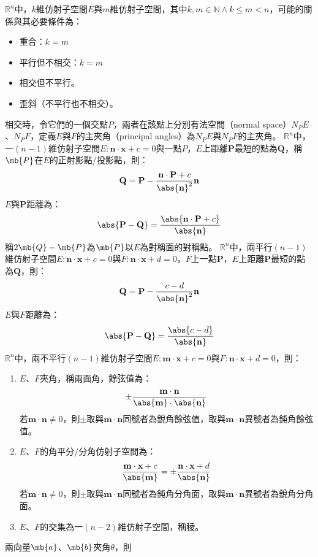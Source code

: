\documentclass[a4paper,12pt]{report}
\begin{document}
$\mathbb{R}^n$中，$k$維仿射子空間$E$與$m$維仿射子空間，其中$k,m\in\mathbb{N}\land k\leq m<n$，可能的關係與其必要條件為：
\begin{itemize}
\item 重合：$k=m$
\item 平行但不相交：$k=m$
\item 相交但不平行。
\item 歪斜（不平行也不相交）。
\end{itemize}
相交時，令它們的一個交點$P$，兩者在該點上分別有法空間（normal space）$N_PE$、$N_PF$，定義$E$與$F$的主夾角（principal angles）為$N_PE$與$N_PF$的主夾角。
$\mathbb{R}^n$中，一$(n-1)$維仿射子空間$E\colon\mathbf{n}\cdot\mathbf{x}+c=0$與一點$P$，$E$上距離$\mathbf{P}$最短的點為$\mathbf{Q}$，稱$\mb{P}$在$E$的正射影點/投影點，則：
\[\mathbf{Q}=\mathbf{P}-\frac{\mathbf{n}\cdot\mathbf{P}+c}{\abs{\mathbf{n}}^2}\mathbf{n}\]
$E$與$\mathbf{P}$距離為：
\[\abs{\mathbf{P}-\mathbf{Q}}=\frac{\abs{\mathbf{n}\cdot\mathbf{P}+c}}{\abs{\mathbf{n}}}\]
稱$2\mb{Q}-\mb{P}$為$\mb{P}$以$E$為對稱面的對稱點。
$\mathbb{R}^n$中，兩平行$(n-1)$維仿射子空間$E\colon\mathbf{n}\cdot\mathbf{x}+c=0$與$F\colon\mathbf{n}\cdot\mathbf{x}+d=0$，$F$上一點$\mathbf{P}$，$E$上距離$\mathbf{P}$最短的點為$\mathbf{Q}$，則：
\[\mathbf{Q}=\mathbf{P}-\frac{c-d}{\abs{\mathbf{n}}^2}\mathbf{n}\]
$E$與$F$距離為：
\[\abs{\mathbf{P}-\mathbf{Q}}=\frac{\abs{c-d}}{\abs{\mathbf{n}}}\]
$\mathbb{R}^n$中，兩不平行$(n-1)$維仿射子空間$E\colon\mathbf{m}\cdot\mathbf{x}+c=0$與$F\colon\mathbf{n}\cdot\mathbf{x}+d=0$，則：
\begin{enumerate}
\item $E$、$F$夾角，稱兩面角，餘弦值為：
\[\pm\frac{\mathbf{m}\cdot\mathbf{n}}{\abs{\mathbf{m}}\cdot\abs{\mathbf{n}}}\]
若$\mathbf{m}\cdot\mathbf{n}\neq 0$，則$\pm$取與$\mathbf{m}\cdot\mathbf{n}$同號者為銳角餘弦值，取與$\mathbf{m}\cdot\mathbf{n}$異號者為鈍角餘弦值。
\item $E$、$F$的角平分/分角仿射子空間為：
\[\frac{\mathbf{m}\cdot\mathbf{x}+c}{\abs{\mathbf{m}}}=\pm\frac{\mathbf{n}\cdot\mathbf{x}+d}{\abs{\mathbf{n}}}\]
若$\mathbf{m}\cdot\mathbf{n}\neq 0$，則$\pm$取與$\mathbf{m}\cdot\mathbf{n}$同號者為鈍角分角面，取與$\mathbf{m}\cdot\mathbf{n}$異號者為銳角分角面。
\item $E$、$F$的交集為一$(n-2)$維仿射子空間，稱稜。
\end{enumerate}
兩向量$\mb{a}$、$\mb{b}$夾角$\theta$，則
\end{document}
